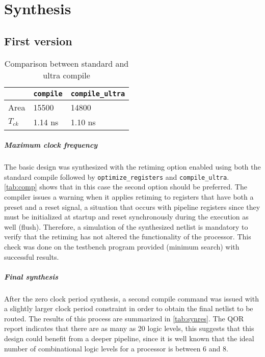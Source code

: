 \chapter{Synthesis}
\section{First version}
\begin{table}[htbp]
	\centering
\begin{tabular}{|l|l|l|}
	\hline
	& \texttt{compile} & \texttt{compile\_ultra}\\\hline
	Area & 15500 & 14800 \\\hline
	$T_{ck}$& 1.14 ns & 1.10 ns\\\hline
\end{tabular}
\caption{Comparison between standard and ultra compile}
\label{tab:comp}
\end{table}

\paragraph{Maximum clock frequency} The basic design was synthesized with the retiming option enabled using both the standard compile followed by \texttt{optimize\_registers} and \texttt{compile\_ultra}. \autoref{tab:comp} shows that in this case the second option should be preferred. The compiler issues a warning when it applies retiming to registers that have both a preset and a reset signal, a situation that occurs with pipeline registers since they must be initialized at startup and reset synchronously during the execution as well (flush). Therefore, a simulation of the synthesized netlist is mandatory to verify that the retiming has not altered the functionality of the processor. This check was done on the testbench program provided (minimum search) with successful results.

\paragraph{Final synthesis} After the zero clock period synthesis, a second compile command was issued with a slightly larger clock period constraint in order to obtain the final netlist to be routed. The results of this process are summarized in \autoref{tab:synres}. The QOR report indicates that there are as many as 20 logic levels, this suggests that this design could benefit from a deeper pipeline, since it is well known that the ideal number of combinational logic levels for a processor is between 6 and 8.

